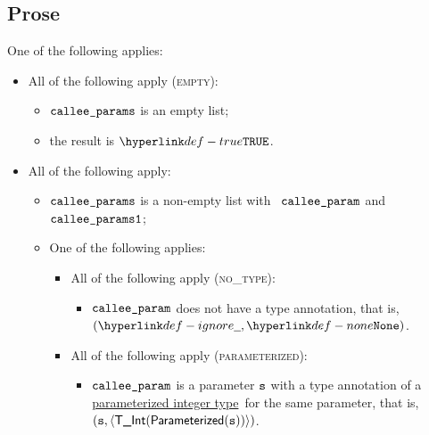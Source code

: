 \documentclass{book}
\newcommand\parameterizedintegertype[0]{\hyperlink{def-parameterizedintegertype}{parameterized integer type}}
\begin{document}
\subsection{Prose}
One of the following applies:
\begin{itemize}
  \item All of the following apply (\textsc{empty}):
  \begin{itemize}
    \item $\texttt{callee\_params}$ is an empty list;
    \item the result is $\True$.
  \end{itemize}

  \item All of the following apply:
  \begin{itemize}
    \item $\texttt{callee\_params}$ is a non-empty list with \head\ $\texttt{callee\_param}$ and \tail\ \\
          $\texttt{callee\_params1}$;
    \item One of the following applies:
    \begin{itemize}
      \item All of the following apply (\textsc{no\_type}):
      \begin{itemize}
        \item $\texttt{callee\_param}$ does not have a type annotation, that is, $(\Ignore, \None)$.
      \end{itemize}

      \item All of the following apply (\textsc{parameterized}):
      \begin{itemize}
        \item $\texttt{callee\_param}$ is a parameter $\texttt{s}$ with a type annotation of a
              \parameterizedintegertype\ for the same parameter, that is, \\
              $(\texttt{s}, \langle\textsf{T\_Int}(\textsf{Parameterized}(\texttt{s}))\rangle)$.
      \end{itemize}


\end{itemize}
\end{itemize}
\end{itemize}
\end{document}
